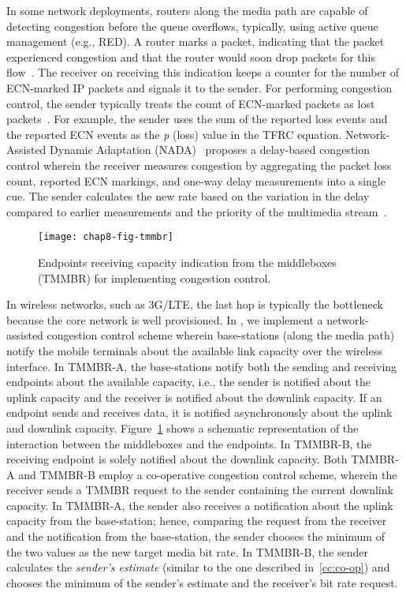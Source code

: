 
In some network deployments, routers along the media path are capable of
detecting congestion before the queue overflows, typically, using active queue
management (e.g., RED). A router marks a packet, indicating that the packet
experienced congestion and that the router would soon drop packets for this
flow~\cite{rfc3168}. The receiver on receiving this indication keeps a counter
for the number of ECN-marked IP packets and signals it to the sender. For
performing congestion control, the sender typically treats the count of 
ECN-marked packets as lost packets~\cite{rfc6679}. For example, the sender uses
the sum of the reported loss events and the reported ECN events as the
\emph{p} (loss) value in the TFRC equation. Network-Assisted Dynamic
Adaptation (NADA)~\cite{rmcat-nada} proposes a delay-based congestion control 
wherein the receiver measures congestion by aggregating the packet loss count,
reported ECN markings, and one-way delay measurements into a single cue. The
sender calculates the new rate based on the variation in the delay compared 
to earlier measurements and the priority of the multimedia stream~\cite{pv-nada}.

\begin{figure}[!t]
\texttt{[image: chap8-fig-tmmbr]}
  \caption{Endpoints receiving capacity indication from the middleboxes
  (TMMBR) for implementing congestion control.}
\label{fig:cc:tmmbrab}
\end{figure}

In wireless networks, such as 3G/LTE, the last hop is typically the bottleneck
because the core network is well provisioned. In , we
implement a network-assisted congestion control scheme wherein base-stations
(along the media path) notify the mobile terminals about the available link
capacity over the wireless interface. 
In TMMBR-A, the base-stations notify both the sending and receiving
endpoints about the available capacity, i.e., the sender is notified about the
uplink capacity and the receiver is notified about the downlink capacity. If
an endpoint sends and receives data, it is notified asynchronously about the
uplink and downlink capacity. Figure~\ref{fig:cc:tmmbrab} shows a schematic
representation of the interaction between the middleboxes and the
endpoints. In TMMBR-B, the receiving endpoint is solely notified about the
downlink capacity. Both TMMBR-A and TMMBR-B employ a co-operative congestion
control scheme, wherein the receiver sends a TMMBR request to the sender
containing the current downlink capacity. In TMMBR-A, the sender also receives
a notification about the uplink capacity from the base-station; hence,
comparing the request from the receiver and the notification from the base-station, 
the sender chooses the minimum of the two values as the new target media bit rate. In
TMMBR-B, the sender calculates the \emph{sender's estimate} (similar to the
one described in~\ref{cc:co-op}) and chooses the minimum of the sender's
estimate and the receiver's bit rate request. 


